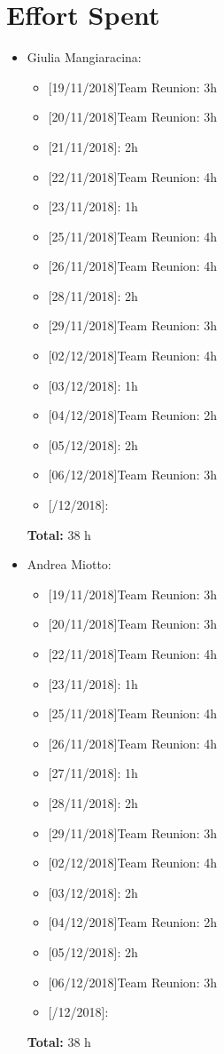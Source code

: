 \chapter{Effort Spent}

\begin{itemize}
\item Giulia Mangiaracina: 
\begin{itemize}
    \item {[}19/11/2018{]}Team Reunion: 3h
    \item {[}20/11/2018{]}Team Reunion: 3h
    \item {[}21/11/2018{]}: 2h
    \item {[}22/11/2018{]}Team Reunion: 4h
    \item {[}23/11/2018{]}: 1h
    \item {[}25/11/2018{]}Team Reunion: 4h
    \item {[}26/11/2018{]}Team Reunion: 4h
    \item {[}28/11/2018{]}: 2h
    \item {[}29/11/2018{]}Team Reunion: 3h
    \item {[}02/12/2018{]}Team Reunion: 4h
    \item {[}03/12/2018{]}: 1h
    \item {[}04/12/2018{]}Team Reunion: 2h
    \item {[}05/12/2018{]}: 2h
    \item {[}06/12/2018{]}Team Reunion: 3h
    \item {[}/12/2018{]}: 
\end{itemize}
\textbf{Total:} 38 h

\item Andrea Miotto: 
\begin{itemize}
     \item {[}19/11/2018{]}Team Reunion: 3h
    \item {[}20/11/2018{]}Team Reunion: 3h
    \item {[}22/11/2018{]}Team Reunion: 4h
    \item {[}23/11/2018{]}: 1h
    \item {[}25/11/2018{]}Team Reunion: 4h
    \item {[}26/11/2018{]}Team Reunion: 4h
    \item {[}27/11/2018{]}: 1h
    \item {[}28/11/2018{]}: 2h
    \item {[}29/11/2018{]}Team Reunion: 3h
    \item {[}02/12/2018{]}Team Reunion: 4h
    \item {[}03/12/2018{]}: 2h
    \item {[}04/12/2018{]}Team Reunion: 2h
    \item {[}05/12/2018{]}: 2h
    \item {[}06/12/2018{]}Team Reunion: 3h
    \item {[}/12/2018{]}:
\end{itemize}
\textbf{Total:} 38 h


\end{itemize}
